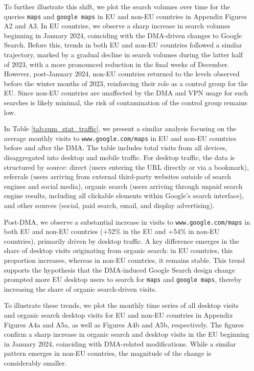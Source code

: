 \documentclass[11pt]{article}
\begin{document}
	To further illustrate this shift, we plot the search volumes over time for the queries \texttt{maps} and \texttt{google maps} in EU and non-EU countries in Appendix Figures A2 and A3. In EU countries, we observe a sharp increase in search volumes beginning in January 2024, coinciding with the DMA-driven changes to Google Search. Before this, trends in both EU and non-EU countries followed a similar trajectory, marked by a gradual decline in search volumes during the latter half of 2023, with a more pronounced reduction in the final weeks of December. However, post-January 2024, non-EU countries returned to the levels observed before the winter months of 2023, reinforcing their role as a control group for the EU. Since non-EU countries are unaffected by the DMA and VPN usage for such searches is likely minimal, the risk of contamination of the control group remains low. 
	
	In Table \ref{tab:sum_stat_traffic}, we present a similar analysis focusing on the average monthly visits to \texttt{www.google.com/maps} in EU and non-EU countries before and after the DMA. The table includes total visits from all devices, disaggregated into desktop and mobile traffic. For desktop traffic, the data is structured by source: direct (users entering the URL directly or via a bookmark), referrals (users arriving from external third-party websites outside of search engines and social media), organic search (users arriving through unpaid search engine results, including all clickable elements within Google’s search interface), and other sources (social, paid search, email, and display advertising).
	
	Post-DMA, we observe a substantial increase in visits to \texttt{www.google.com/maps} in both EU and non-EU countries (+52\% in the EU and +54\% in non-EU countries), primarily driven by desktop traffic. A key difference emerges in the share of desktop visits originating from organic search: in EU countries, this proportion increases, whereas in non-EU countries, it remains stable. This trend supports the hypothesis that the DMA-induced Google Search design change prompted more EU desktop users to search for \texttt{maps} and \texttt{google maps}, thereby increasing the share of organic search-driven visits.
	
	To illustrate these trends, we plot the monthly time series of all desktop visits and organic search desktop visits for EU and non-EU countries in Appendix Figures A4a and A5a, as well as Figures A4b and A5b, respectively. The figures confirm a sharp increase in organic search and desktop visits in the EU beginning in January 2024, coinciding with DMA-related modifications. While a similar pattern emerges in non-EU countries, the magnitude of the change is considerably smaller.
	
\end{document}
